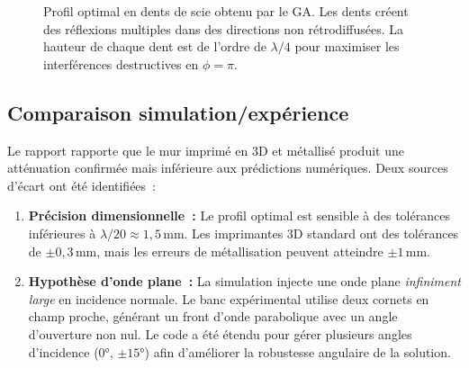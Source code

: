 \documentclass[12pt,a4paper]{article}
\numberwithin{equation}{section}
\numberwithin{figure}{section}
\numberwithin{table}{section}
\begin{document}
\begin{figure}[h!]
\centering
{}
\caption{Profil optimal en dents de scie obtenu par le GA. Les dents créent
des réflexions multiples dans des directions non rétrodiffusées. La hauteur de
chaque dent est de l'ordre de $\lambda/4$ pour maximiser les interférences
destructives en $\phi=\pi$.}
\label{fig:sawtooth}
\end{figure}

\subsection{Comparaison simulation/expérience}

Le rapport rapporte que le mur imprimé en 3D et
métallisé produit une atténuation confirmée mais inférieure aux prédictions
numériques. Deux sources d'écart ont été identifiées~:

\begin{enumerate}
    \item \textbf{Précision dimensionnelle~:} Le profil optimal est sensible
    à des tolérances inférieures à $\lambda/20 \approx 1{,}5\,\text{mm}$.
    Les imprimantes 3D standard ont des tolérances de $\pm 0{,}3\,\text{mm}$,
    mais les erreurs de métallisation peuvent atteindre $\pm 1\,\text{mm}$.

    \item \textbf{Hypothèse d'onde plane~:} La simulation injecte une onde
    plane \emph{infiniment large} en incidence normale. Le banc expérimental
    utilise deux cornets en champ proche, générant un front d'onde parabolique
    avec un angle d'ouverture non nul. Le code a été étendu pour gérer
    plusieurs angles d'incidence ($0°$, $\pm 15°$) afin d'améliorer la
    robustesse angulaire de la solution.
\end{enumerate}
\end{document}
